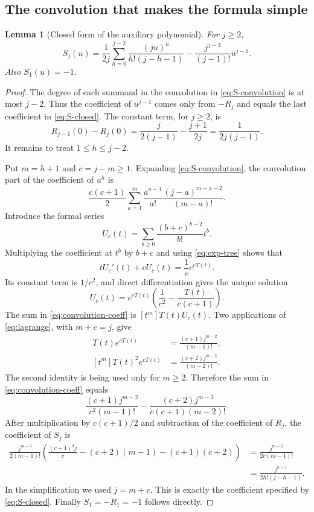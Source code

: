 \documentclass[11pt,letterpaper]{article}
\numberwithin{equation}{section}
\newtheorem{lemma}[theorem]{Lemma}
\theoremstyle{definition}
\begin{document}
\subsection{The convolution that makes the formula simple}
\begin{lemma}[Closed form of the auxiliary polynomial]\label{lem:S}
For $j\ge2$,
\begin{equation}\label{eq:S-closed}
 S_j(u)=\frac1{2j}\sum_{h=0}^{j-2}
      \frac{(ju)^h}{h!(j-h-1)}
      -\frac{j^{j-3}}{(j-1)!}u^{j-1}.
\end{equation}
Also $S_1(u)=-1$.
\end{lemma}
\begin{proof}
The degree of each summand in the convolution in \eqref{eq:S-convolution}
is at most $j-2$. Thus the coefficient of $u^{j-1}$ comes only from $-R_j$
and equals the last coefficient in \eqref{eq:S-closed}. The constant term,
for $j\ge2$, is
\[
 R_{j-1}(0)-R_j(0)
 =\frac{j}{2(j-1)}-\frac{j+1}{2j}
 =\frac1{2j(j-1)}.
\]
It remains to treat $1\le h\le j-2$.

Put $m=h+1$ and $c=j-m\ge1$. Expanding \eqref{eq:S-convolution}, the
convolution part of the coefficient of $u^h$ is
\begin{equation}\label{eq:convolution-coeff}
 \frac{c(c+1)}2
 \sum_{a=1}^{m}\frac{a^{a-1}}{a!}
               \frac{(j-a)^{m-a-2}}{(m-a)!}.
\end{equation}
Introduce the formal series
\[
 U_c(t)=\sum_{b\ge0}\frac{(b+c)^{b-2}}{b!}t^b.
\]
Multiplying the coefficient at $t^b$ by $b+c$ and using
\eqref{eq:exp-tree} shows that
\[
 tU_c'(t)+cU_c(t)=\frac1c e^{cT(t)}.
\]
Its constant term is $1/c^2$, and direct differentiation gives the unique
solution
\begin{equation}\label{eq:Uc}
 U_c(t)=e^{cT(t)}\left(\frac1{c^2}-\frac{T(t)}{c(c+1)}\right).
\end{equation}
The sum in \eqref{eq:convolution-coeff} is $[t^m]T(t)U_c(t)$.
Two applications of \eqref{eq:lagrange}, with $m+c=j$, give
\begin{align*}
 [t^m]T(t)e^{cT(t)}&=\frac{(c+1)j^{m-2}}{(m-1)!},\\
 [t^m]T(t)^2e^{cT(t)}&=\frac{(c+2)j^{m-3}}{(m-2)!}.
\end{align*}
The second identity is being used only for $m\ge2$.
Therefore the sum in \eqref{eq:convolution-coeff} equals
\[
 \frac{(c+1)j^{m-2}}{c^2(m-1)!}
 -\frac{(c+2)j^{m-3}}{c(c+1)(m-2)!}.
\]
After multiplication by $c(c+1)/2$ and subtraction of the coefficient of
$R_j$, the coefficient of $S_j$ is
\begin{align*}
 \frac{j^{m-3}}{2(m-1)!}
 \left(\frac{(c+1)^2j}{c}-(c+2)(m-1)-(c+1)(c+2)\right)
 &=\frac{j^{m-2}}{2c(m-1)!}\\
 &=\frac{j^{h-1}}{2h!(j-h-1)}.
\end{align*}
In the simplification we used $j=m+c$. This is exactly the coefficient
specified by \eqref{eq:S-closed}. Finally $S_1=-R_1=-1$ follows directly.
\end{proof}
\end{document}
